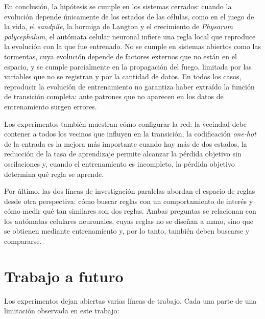 En conclusión, la hipótesis se cumple en los sistemas cerrados: cuando la evolución depende únicamente de los estados de las células, como en el juego de la vida, el \textit{sandpile}, la hormiga de Langton y el crecimiento de \textit{Physarum polycephalum}, el autómata celular neuronal infiere una regla local que reproduce la evolución con la que fue entrenado. No se cumple en sistemas abiertos como las tormentas, cuya evolución depende de factores externos que no están en el espacio, y se cumple parcialmente en la propagación del fuego, limitada por las variables que no se registran y por la cantidad de datos. En todos los casos, reproducir la evolución de entrenamiento no garantiza haber extraído la función de transición completa: ante patrones que no aparecen en los datos de entrenamiento surgen errores.

Los experimentos también muestran cómo configurar la red: la vecindad debe contener a todos los vecinos que influyen en la transición, la codificación \textit{one-hot} de la entrada es la mejora más importante cuando hay más de dos estados, la reducción de la tasa de aprendizaje permite alcanzar la pérdida objetivo sin oscilaciones y, cuando el entrenamiento es incompleto, la pérdida objetivo determina qué regla se aprende.

Por último, las dos líneas de investigación paralelas abordan el espacio de reglas desde otra perspectiva: cómo buscar reglas con un comportamiento de interés y cómo medir qué tan similares son dos reglas. Ambas preguntas se relacionan con los autómatas celulares neuronales, cuyas reglas no se diseñan a mano, sino que se obtienen mediante entrenamiento y, por lo tanto, también deben buscarse y compararse.

\section{Trabajo a futuro}

Los experimentos dejan abiertas varias líneas de trabajo. Cada una parte de una limitación observada en este trabajo:

